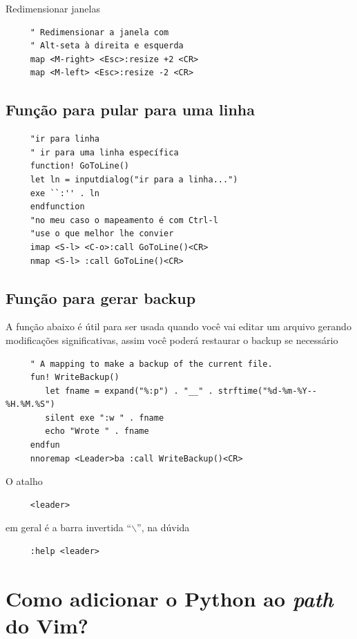 \documentclass[10pt,a4paper,openany]{book}
\begin{document}
Redimensionar janelas

\begin{verbatim}
     " Redimensionar a janela com
     " Alt-seta à direita e esquerda
     map <M-right> <Esc>:resize +2 <CR>
     map <M-left> <Esc>:resize -2 <CR>
\end{verbatim}

\subsection{Função para pular para uma linha}
\label{Função para pular para uma linha}

\begin{verbatim}
     "ir para linha
     " ir para uma linha específica
     function! GoToLine()
     let ln = inputdialog("ir para a linha...")
     exe ``:'' . ln
     endfunction
     "no meu caso o mapeamento é com Ctrl-l
     "use o que melhor lhe convier
     imap <S-l> <C-o>:call GoToLine()<CR>
     nmap <S-l> :call GoToLine()<CR>
\end{verbatim}

\subsection{Função para gerar backup}
\label{Função para gerar backup}

A função abaixo é útil para ser usada quando você vai editar um arquivo
gerando modificações significativas, assim você poderá restaurar o backup se necessário

\begin{verbatim}
     " A mapping to make a backup of the current file.
     fun! WriteBackup()
        let fname = expand("%:p") . "__" . strftime("%d-%m-%Y--%H.%M.%S")
        silent exe ":w " . fname
        echo "Wrote " . fname
     endfun
     nnoremap <Leader>ba :call WriteBackup()<CR>
\end{verbatim}

O atalho

\begin{verbatim}
     <leader>
\end{verbatim}

em geral é a barra invertida ``$\backslash$'', na dúvida

\begin{verbatim}
     :help <leader>
\end{verbatim}

\section{Como adicionar o Python ao {\em path} do Vim?}
\label{Como adicionar o python ao path do Vim?}
\end{document}
